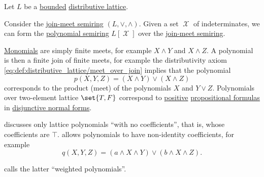 \begin{remark}\label{rem:lattice_polynomials}
  Let \( L \) be a \hyperref[def:extremal_points/bounds]{bounded} \hyperref[def:distributive_lattice]{distributive lattice}.

  Consider the \hyperref[ex:def:semiring/lattice]{join-meet semiring} \( (L, \vee, \wedge) \). Given a set \( \mscrX \) of indeterminates, we can form the \hyperref[def:polynomial_algebra]{polynomial semiring} \( L[\mscrX] \) over the \hyperref[ex:def:semiring/lattice]{join-meet semiring}.

  \hyperref[def:polynomial_algebra/monomials]{Monomials} are simply finite meets, for example \( X \wedge Y \) and \( X \wedge Z \). A polynomial is then a finite join of finite meets, for example the distributivity axiom \eqref{eq:def:distributive_lattice/meet_over_join} implies that the polynomial
  \begin{equation*}
    p(X, Y, Z) = (X \wedge Y) \vee (X \wedge Z)
  \end{equation*}
  corresponds to the product (meet) of the polynomials \( X \) and \( Y \vee Z \). Polynomials over two-element lattice \( \set{ T, F } \) correspond to \hyperref[def:positive_formula]{positive} \hyperref[def:propositional_formula]{propositional formulas} in \hyperref[def:cnf_and_dnf]{disjunctive normal forms}.

   discusses only lattice polynomials \enquote{with no coefficients}, that is, whose coefficients are \( \top \).  allows polynomials to have non-identity coefficients, for example
  \begin{equation*}
    q(X, Y, Z) = (a \wedge X \wedge Y) \vee (b \wedge X \wedge Z).
  \end{equation*}

   calls the latter \enquote{weighted polynomials}.
\end{remark}

